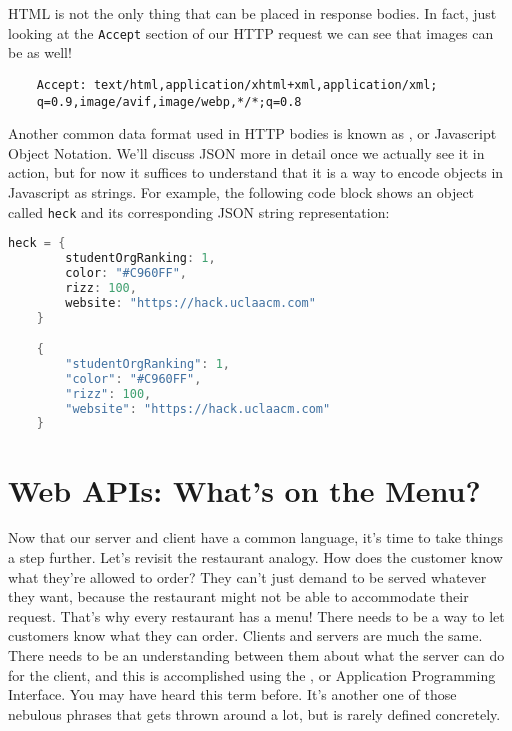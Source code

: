
HTML is not the only thing that can be placed in response bodies. In fact, just looking at the \texttt{Accept} section of our HTTP request we can see that images can be as well!

\begin{verbatim}
    Accept: text/html,application/xhtml+xml,application/xml;
    q=0.9,image/avif,image/webp,*/*;q=0.8
\end{verbatim}

Another common data format used in HTTP bodies is known as , or Javascript Object Notation. We'll discuss JSON more in detail once we actually see it in action, but for now it suffices to understand that it is a way to encode objects in Javascript as strings. For example, the following code block shows an object called \texttt{heck} and its corresponding JSON string representation:

\vspace{.5cm}

\begin{lstlisting}[language=Java]
    heck = {
        studentOrgRanking: 1,
        color: "#C960FF",
        rizz: 100,
        website: "https://hack.uclaacm.com"
    }

    {
        "studentOrgRanking": 1,
        "color": "#C960FF",
        "rizz": 100,
        "website": "https://hack.uclaacm.com"
    }
\end{lstlisting}


\section{Web APIs: What's on the Menu?}

Now that our server and client have a common language, it's time to take things a step further. Let's revisit the restaurant analogy. How does the customer know what they're allowed to order? They can't just demand to be served whatever they want, because the restaurant might not be able to accommodate their request. That's why every restaurant has a menu! There needs to be a way to let customers know what they can order. Clients and servers are much the same. There needs to be an understanding between them about what the server can do for the client, and this is accomplished using the , or Application Programming Interface. You may have heard this term before. It's another one of those nebulous phrases that gets thrown around a lot, but is rarely defined concretely.

